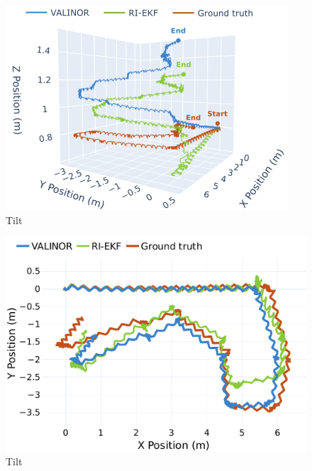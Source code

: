 \documentclass{IJCAS}
\begin{document}
\begin{figure}[!t]
\begin{center}
\includegraphics[width=\columnwidth]{Uploaded/Images/trajectory_rhps1_3d.png} 
\vskip -0.5pc
\caption{Tilt}\label{fig:trajRhps1}
\end{center}
\vskip -1.5pc
\end{figure}

\begin{figure}[!t]
\begin{center}
\includegraphics[width=\columnwidth]{Uploaded/Images/trajectory_rhps1.pdf} 
\vskip -0.5pc
\caption{Tilt}\label{fig:trajRhps1_3d}
\end{center}
\vskip -1.5pc
\end{figure}
\end{document}
